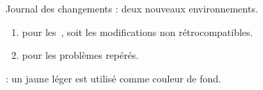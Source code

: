 \documentclass[12pt, a4paper]{article}
\begin{document}
\begin{tdocnew}
	\item Journal des changements : deux nouveaux environnements.
    \begin{enumerate}
        \item {} pour les \,, soit les modifications non rétrocompatibles.

        \item {} pour les problèmes repérés.
    \end{enumerate}

	\item {}: un jaune léger est utilisé comme couleur de fond.
\end{tdocnew}
\end{document}
